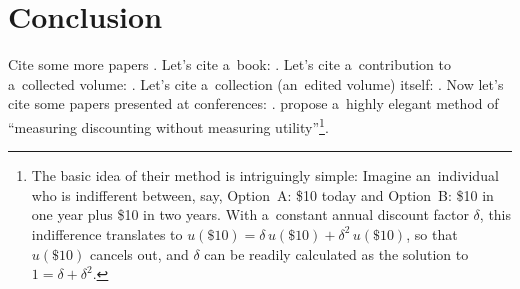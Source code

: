 


\blindmathfalse


\section{Conclusion}
\label{sec:Conclusion}

Cite some more papers \citep[see, e.g.,][]{Yaari1965, Warner2001, Davidoff2005, Benartzi2011}. Let's cite a~book: \cite{Luce1959}. Let's cite a~contribution to a~collected volume: \cite{Harrison2008}. Let's cite a~collection (an~edited volume) itself: \cite{Kagel2016}. Now let's cite some papers presented at conferences: \cite{Beute2012, Vosgerau2008}. \cite{Attema2016} propose a~highly elegant method of ``measuring discounting without measuring utility''\footnote{The basic idea of their method is intriguingly simple: Imagine an~individual who is indifferent between, say, Option~A: \$10 today and Option~B: \$10 in one year plus \$10 in two years. With a~constant annual discount factor $\delta$, this indifference translates to $u(\$10) = \delta\,u(\$10) + \delta^2\,u(\$10)$, so that $u(\$10)$ cancels out, and $\delta$ can be readily calculated as the solution to $1 = {\delta + \delta^2}$.}.

\blindtext